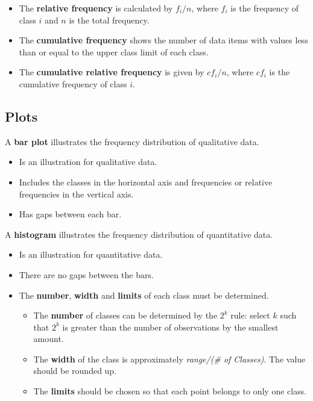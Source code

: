 \documentclass[
  letterpaper,
  DIV=11,
  numbers=noendperiod]{scrreprt}
\providecommand{\tightlist}{%
  \setlength{\itemsep}{0pt}\setlength{\parskip}{0pt}}\usepackage{longtable,booktabs,array}
\begin{document}
\begin{itemize}
\tightlist
\item
  The \textbf{relative frequency} is calculated by \(f_{i}/n\), where
  \(f_{i}\) is the frequency of class \(i\) and \(n\) is the total
  frequency.
\item
  The \textbf{cumulative frequency} shows the number of data items with
  values less than or equal to the upper class limit of each class.
\item
  The \textbf{cumulative relative frequency} is given by \(cf_{i}/n\),
  where \(cf_{i}\) is the cumulative frequency of class \(i\).
\end{itemize}

\hypertarget{plots}{%
\subsection*{Plots}\label{plots}}

A \textbf{bar plot} illustrates the frequency distribution of
qualitative data.

\begin{itemize}
\item
  Is an illustration for qualitative data.
\item
  Includes the classes in the horizontal axis and frequencies or
  relative frequencies in the vertical axis.
\item
  Has gaps between each bar.
\end{itemize}

A \textbf{histogram} illustrates the frequency distribution of
quantitative data.

\begin{itemize}
\item
  Is an illustration for quantitative data.
\item
  There are no gaps between the bars.
\item
  The \textbf{number}, \textbf{width} and \textbf{limits} of each class
  must be determined.

  \begin{itemize}
  \tightlist
  \item
    The \textbf{number} of classes can be determined by the \(2^k\)
    rule: select \(k\) such that \(2^k\) is greater than the number of
    observations by the smallest amount.
  \item
    The \textbf{width} of the class is approximately \emph{range/(\# of
    Classes)}. The value should be rounded up.
  \item
    The \textbf{limits} should be chosen so that each point belongs to
    only one class.
  \end{itemize}
\end{itemize}
\end{document}
